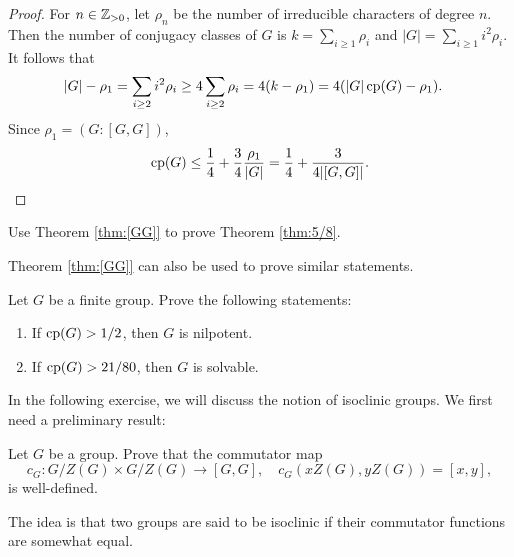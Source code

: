 \begin{proof}
    For $n\in\mathbb{Z}_{>0}$, let $\rho_n$ be the number
    of irreducible characters of degree $n$. Then 
    the number of conjugacy classes of $G$ is $k=\sum_{i\geq1}\rho_i$
    and $|G|=\sum_{i\geq1}i^2\rho_i$. 
    It follows that 
    \begin{align*}
    |G|-\rho_1 &=\sum_{i\geq 2}i^2\rho_i\geq 4\sum_{i\geq2}\rho_i
    =4(k-\rho_1)=4(|G|\operatorname{cp}(G)-\rho_1).
    \end{align*}
    Since $\rho_1=(G:[G,G])$, 
    \[
    \operatorname{cp}(G)\leq \frac14+\frac34\frac{\rho_1}{|G|}=\frac14+\frac3{4|[G,G]|}.\qedhere 
    \]
\end{proof}

\begin{exercise}
    \label{xca:5/8}
    Use Theorem \ref{thm:[GG]} to prove Theorem \ref{thm:5/8}.
\end{exercise}

Theorem \ref{thm:[GG]} 
can also be used to
prove similar statements. 

\begin{exercise}
    \label{xca:cp_NS}
    Let $G$ be a finite group. Prove the following statements:
    \begin{enumerate}
        \item If $\operatorname{cp}(G)>1/2$, then $G$ is nilpotent.
        \item If $\operatorname{cp}(G)>21/80$, then $G$ is solvable. 
    \end{enumerate}
\end{exercise}

In the following exercise, we will discuss the notion 
of isoclinic groups. We first need
a preliminary result:

\begin{exercise}
\label{xca:commutator_map}
    Let $G$ be a group. Prove that the commutator map
    \[
    c_G\colon G/Z(G)\times G/Z(G)\to [G,G],
    \quad
    c_G(xZ(G),yZ(G))=[x,y],
    \]
    is well-defined. 
\end{exercise}

The idea is that two groups are said to be isoclinic 
if their commutator functions are somewhat equal. 

